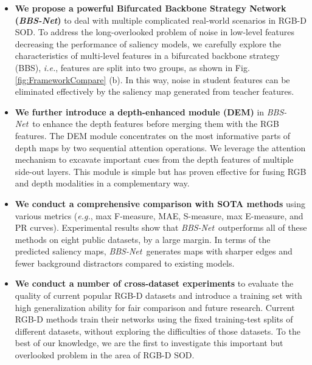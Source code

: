 \documentclass[journal]{IEEEtran}
\newcommand{\figref}[1]{Fig. \ref{#1}}
\def\ie{\emph{i.e.}}
\def\eg{\emph{e.g.}}
\def\ourmodel{\emph{BBS-Net}}
\begin{document}
\begin{itemize}
	\item
	\textbf{We propose a powerful Bifurcated Backbone Strategy Network (\ourmodel)} to deal with multiple complicated real-world scenarios in RGB-D SOD.
To address the long-overlooked problem of noise in low-level features decreasing the performance of saliency models, 
	we carefully explore the characteristics of multi-level features in a bifurcated backbone strategy (BBS), \ie, features are split into two groups, as shown in \figref{fig:FrameworkCompare} (b).
In this way, noise in student features can be eliminated effectively by the saliency map generated from teacher features.
	
\item	
	\textbf{We further introduce a depth-enhanced module (DEM)} in \ourmodel~to enhance the depth features before merging them with the RGB features.
The DEM module concentrates on the most informative parts of depth maps by two sequential attention operations. We leverage the attention mechanism to excavate important cues from the depth features of multiple side-out layers. This module is simple but has proven effective for fusing RGB and depth modalities in a complementary way.
	
\item
	\textbf{We conduct a comprehensive comparison with  SOTA methods} using various metrics (\eg, max F-measure, MAE, S-measure, max E-measure, and PR curves).
Experimental results show that \ourmodel~outperforms all of these methods on eight public datasets, by a large margin.
In terms of the predicted saliency maps, \ourmodel~generates maps with sharper edges and fewer background distractors compared to existing models.


\item
	\textbf{We conduct a number of cross-dataset experiments} to evaluate the quality of current popular RGB-D datasets and introduce a training set with high generalization ability for fair comparison and future research.
Current RGB-D methods train their networks using the fixed training-test splits of different datasets, without exploring the difficulties of those datasets.
To the best of our knowledge, we are the first to investigate this important but overlooked problem in the area of RGB-D SOD.
\end{itemize}
\end{document}
